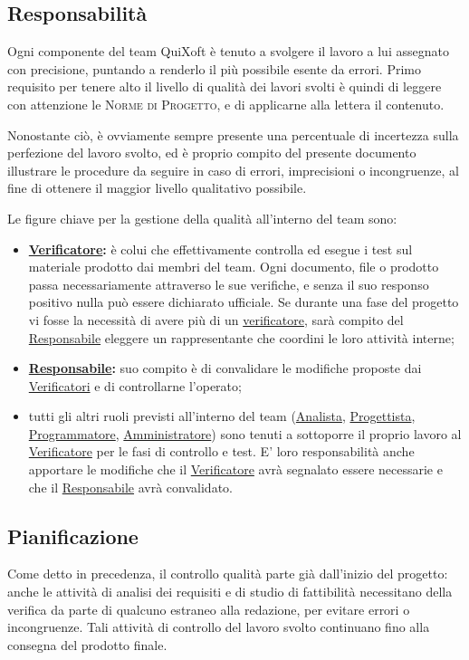 \documentclass[11pt,a4paper]{article}
\begin{document}
\subsection{Responsabilità}
Ogni componente del team QuiXoft è tenuto a svolgere il lavoro a lui assegnato con precisione, puntando a renderlo il più possibile esente da errori.
Primo requisito per tenere alto il livello di qualità dei lavori svolti è quindi di leggere con attenzione le \textsc{Norme di Progetto}, e di applicarne alla lettera il contenuto.

Nonostante ciò, è ovviamente sempre presente una percentuale di incertezza sulla perfezione del lavoro svolto, ed è proprio compito del presente documento illustrare le procedure da seguire in caso di errori, imprecisioni o incongruenze, al fine di ottenere il maggior livello qualitativo possibile.

Le figure chiave per la gestione della qualità all'interno del team sono:
\begin{itemize}
	\item \textbf{\underline{Verificatore}:} è colui che effettivamente controlla ed esegue i test sul materiale prodotto dai membri del team. Ogni documento, file o prodotto passa necessariamente attraverso le sue verifiche, e senza il suo responso positivo nulla può essere dichiarato ufficiale. Se durante una fase del progetto vi fosse la necessità di avere più di un \underline{verificatore}, sarà compito del \underline{Responsabile} eleggere un rappresentante che coordini le loro attività interne;
	\item \textbf{\underline{Responsabile}:} suo compito è di convalidare le modifiche proposte dai \underline{Verificatori} e di controllarne l'operato;
	\item tutti gli altri ruoli previsti all'interno del team (\underline{Analista}, \underline{Progettista}, \underline{Programmatore}, \underline{Amministratore}) sono tenuti a sottoporre il proprio lavoro al \underline{Verificatore} per le fasi di controllo e test. E' loro responsabilità anche apportare le modifiche che il \underline{Verificatore} avrà segnalato essere necessarie e che il \underline{Responsabile} avrà convalidato.
\end{itemize}
\subsection{Pianificazione}
Come detto in precedenza, il controllo qualità parte già dall'inizio del progetto: anche le attività di analisi dei requisiti e di studio di fattibilità necessitano della verifica da parte di qualcuno estraneo alla redazione, per evitare errori o incongruenze.
Tali attività di controllo del lavoro svolto continuano fino alla consegna del prodotto finale.
\end{document}
